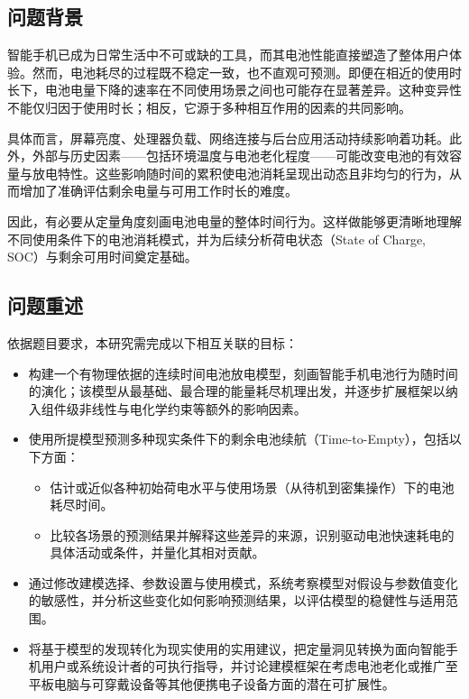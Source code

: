 \documentclass[11pt,a4paper]{ctexart}
\begin{document}
\subsection{问题背景}

智能手机已成为日常生活中不可或缺的工具，而其电池性能直接塑造了整体用户体验。然而，电池耗尽的过程既不稳定一致，也不直观可预测。即便在相近的使用时长下，电池电量下降的速率在不同使用场景之间也可能存在显著差异\cite{carroll2010}。这种变异性不能仅归因于使用时长；相反，它源于多种相互作用的因素的共同影响。

具体而言，屏幕亮度、处理器负载、网络连接与后台应用活动持续影响着功耗。此外，外部与历史因素——包括环境温度与电池老化程度——可能改变电池的有效容量与放电特性。这些影响随时间的累积使电池消耗呈现出动态且非均匀的行为，从而增加了准确评估剩余电量与可用工作时长的难度\cite{djordjevic2006}。

因此，有必要从定量角度刻画电池电量的整体时间行为。这样做能够更清晰地理解不同使用条件下的电池消耗模式，并为后续分析荷电状态（State of Charge, SOC）与剩余可用时间奠定基础。

\subsection{问题重述}

依据题目要求，本研究需完成以下相互关联的目标：

\begin{itemize}[leftmargin=2em]
\item 构建一个有物理依据的连续时间电池放电模型，刻画智能手机电池行为随时间的演化；该模型从最基础、最合理的能量耗尽机理出发，并逐步扩展框架以纳入组件级非线性与电化学约束等额外的影响因素。
\item 使用所提模型预测多种现实条件下的剩余电池续航（Time-to-Empty），包括以下方面：
  \begin{itemize}[leftmargin=1.6em,label=--]
  \item 估计或近似各种初始荷电水平与使用场景（从待机到密集操作）下的电池耗尽时间。
  \item 比较各场景的预测结果并解释这些差异的来源，识别驱动电池快速耗电的具体活动或条件，并量化其相对贡献。
  \end{itemize}
\item 通过修改建模选择、参数设置与使用模式，系统考察模型对假设与参数值变化的敏感性，并分析这些变化如何影响预测结果，以评估模型的稳健性与适用范围。
\item 将基于模型的发现转化为现实使用的实用建议，把定量洞见转换为面向智能手机用户或系统设计者的可执行指导，并讨论建模框架在考虑电池老化或推广至平板电脑与可穿戴设备等其他便携电子设备方面的潜在可扩展性。
\end{itemize}
\end{document}
